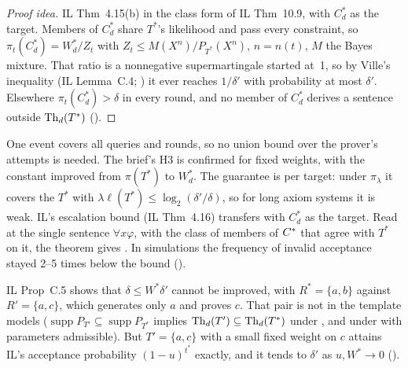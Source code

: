 \begin{proof}[Proof idea]
IL Thm~4.15(b) in the class form of IL Thm~10.9, with $C^*_d$ as the target. Members of $C^*_d$ share $T^*$'s likelihood and pass every constraint, so $\pi_t(C^*_d)=W^*_d/Z_t$ with $Z_t\le M(X^{n})/P_{T^*}(X^{n})$, $n=n(t)$, $M$ the Bayes mixture. That ratio is a nonnegative supermartingale started at~1, so by Ville's inequality (IL Lemma~C.4; \citealp{ville1939etude}) it ever reaches $1/\delta'$ with probability at most $\delta'$. Elsewhere $\pi_t(C^*_d)>\delta$ in every round, and no member of $C^*_d$ derives a sentence outside $\mathrm{Th}_d(T^*)$ ().
\end{proof}

One event covers all queries and rounds, so no union bound over the prover's attempts is needed. The brief's H3 is confirmed for fixed weights, with the constant improved from $\pi(T^*)$ to $W^*_d$. The guarantee is per target: under $\pi_\lambda$ it covers the $T^*$ with $\lambda\ell(T^*)\le\log_2(\delta'/\delta)$, so for long axiom systems it is weak. IL's escalation bound (IL Thm~4.16) transfers with $C^*_d$ as the target. Read at the single sentence $\forall x\varphi$, with the class of members of $C^{*}$ that agree with $T^*$ on it, the theorem gives . In simulations the frequency of invalid acceptance stayed 2--5 times below the bound ().

\begin{remark}\label{rem:sound:tight}
IL Prop~C.5 shows that $\delta\le W^*\delta'$ cannot be improved, with $R^*=\{a,b\}$ against $R'=\{a,c\}$, which generates only $a$ and proves $c$. That pair is not in the template models ($\operatorname{supp}P_{T'}\subseteq\operatorname{supp}P_{T^*}$ implies $\mathrm{Th}_d(T')\subseteq\mathrm{Th}_d(T^*)$ under \Lzero, and under \Lone{} with parameters admissible). But $T'=\{a,c\}$ with a small fixed weight on $c$ attains IL's acceptance probability $(1-u)^{t^*}$ exactly, and it tends to $\delta'$ as $u,W^*\to0$ ().
\end{remark}

